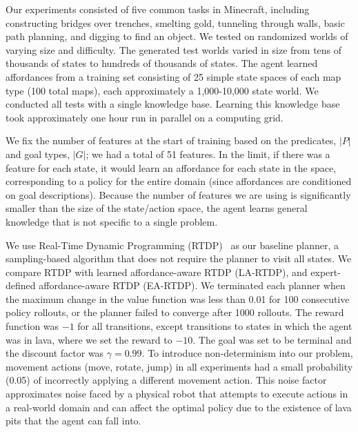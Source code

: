 \documentclass[letterpaper]{article}
\begin{document}
Our experiments consisted of five common tasks in Minecraft, including
constructing bridges over trenches, smelting gold, tunneling through
walls, basic path planning, and digging to find an object.  We tested
on randomized worlds of varying size and difficulty. The generated
test worlds varied in size from tens of thousands of states to
hundreds of thousands of states.  The agent learned affordances from a
training set consisting of 25 simple state spaces of each map type
(100 total maps), each approximately a 1,000-10,000 state world. We
conducted all tests with a single knowledge base. Learning this knowledge base
took approximately one hour run in parallel on a computing grid. 


We fix the number of features at the start of training based on the
predicates, $|P|$ and goal types, $|G|$; we had a total of 51
features.  In the limit, if there was a feature for each state, it
would learn an affordance for each state in the space, corresponding
to a policy for the entire domain (since affordances are conditioned
on goal descriptions).  Because the number of features we are using is
significantly smaller than the size of the state/action space, the
agent learns general knowledge that is not specific to a single
problem.

We use Real-Time Dynamic Programming (RTDP)~\cite{barto95} as our
baseline planner, a sampling-based algorithm that does not require the
planner to visit all states. We compare RTDP with learned
affordance-aware RTDP (LA-RTDP), and expert-defined affordance-aware
RTDP (EA-RTDP). We terminated each planner when the maximum change in
the value function was less than 0.01 for 100 consecutive policy
rollouts, or the planner failed to converge after 1000 rollouts.  The
reward function was $-1$ for all transitions, except transitions to
states in which the agent was in lava, where we set the reward to
$-10$. The goal was set to be terminal and the discount factor was
$\gamma = 0.99$.  To introduce non-determinism into our problem,
movement actions (move, rotate, jump) in all experiments had a small
probability (0.05) of incorrectly applying a different movement
action.  This noise factor approximates noise faced by a physical
robot that attempts to execute actions in a real-world domain and
can affect the optimal policy due to the existence of lava pits
that the agent can fall into. 
\end{document}
